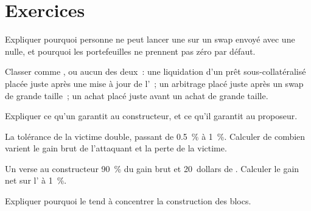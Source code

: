 \section{Exercices}

\begin{exercise}[$\star$]\label{exo:m3:maximal-extractable-value:1}
Expliquer pourquoi personne ne peut lancer une  sur un swap envoyé avec une  nulle, et pourquoi les portefeuilles ne prennent pas zéro par défaut.
\end{exercise}

\begin{exercise}[$\star$]\label{exo:m3:maximal-extractable-value:2}
Classer comme ,  ou aucun des deux~: une liquidation d'un prêt sous-collatéralisé placée juste après une mise à jour de l'~; un arbitrage
placé juste après un swap de grande taille~; un achat placé juste avant un achat de grande taille.
\end{exercise}

\begin{exercise}[$\star$]\label{exo:m3:maximal-extractable-value:3}
Expliquer ce qu'un  garantit au constructeur, et ce qu'il garantit au proposeur.
\end{exercise}

\begin{exercise}[$\star\star$]\label{exo:m3:maximal-extractable-value:4}
La tolérance de la victime double, passant de 0.5~\% à 1~\%. Calculer de combien varient le gain brut de l'attaquant et la perte de la victime.
\end{exercise}

\begin{exercise}[$\star\star$]\label{exo:m3:maximal-extractable-value:5}
Un  verse au constructeur 90~\% du gain brut et 20~dollars de . Calculer le gain net sur l' à 1~\%.
\end{exercise}

\begin{exercise}[$\star\star$]\label{exo:m3:maximal-extractable-value:6}
Expliquer pourquoi le  tend à concentrer la construction des blocs.
\end{exercise}

